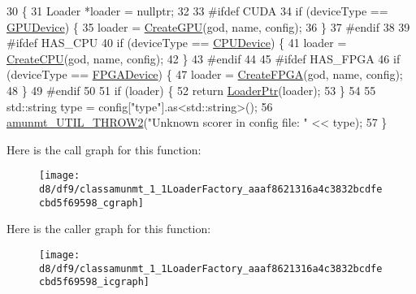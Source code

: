 \begin{DoxyCode}
30                                  \{
31   Loader *loader = \textcolor{keyword}{nullptr};
32 
33 \textcolor{preprocessor}{#ifdef CUDA}
34   \textcolor{keywordflow}{if} (deviceType == \hyperlink{namespaceamunmt_a0f0dad0deb73c5a4c574d8c63833ab17a2ff3f7952956ae21ddcfa3564fe4de5f}{GPUDevice}) \{
35     loader = \hyperlink{classamunmt_1_1LoaderFactory_a78af7437386e23443b9d02bb4f8be24b}{CreateGPU}(god, name, config);
36   \}
37 \textcolor{preprocessor}{#endif}
38 
39 \textcolor{preprocessor}{#ifdef HAS\_CPU}
40   \textcolor{keywordflow}{if} (deviceType == \hyperlink{namespaceamunmt_a0f0dad0deb73c5a4c574d8c63833ab17aafe1036ae66e30a8f082bda43072162a}{CPUDevice}) \{
41     loader = \hyperlink{classamunmt_1_1LoaderFactory_a78832d75891d43a96d36c1e61c6940b4}{CreateCPU}(god, name, config);
42   \}
43 \textcolor{preprocessor}{#endif}
44 
45 \textcolor{preprocessor}{#ifdef HAS\_FPGA}
46   \textcolor{keywordflow}{if} (deviceType == \hyperlink{namespaceamunmt_a0f0dad0deb73c5a4c574d8c63833ab17a1fd21d75952419f8b1ab988f28f747fc}{FPGADevice}) \{
47     loader = \hyperlink{classamunmt_1_1LoaderFactory_a167b89f68880a90da333d3a61458472b}{CreateFPGA}(god, name, config);
48   \}
49 \textcolor{preprocessor}{#endif}
50 
51   \textcolor{keywordflow}{if} (loader) \{
52     \textcolor{keywordflow}{return} \hyperlink{namespaceamunmt_a7907c3626488deed31e31452d178d78e}{LoaderPtr}(loader);
53   \}
54 
55   std::string type = config[\textcolor{stringliteral}{"type"}].as<std::string>();
56   \hyperlink{exception_8h_a620a250f8b1bb0d664281ec2eb1b5b41}{amunmt\_UTIL\_THROW2}(\textcolor{stringliteral}{"Unknown scorer in config file: "} << type);
57 \}
\end{DoxyCode}


Here is the call graph for this function\+:
\nopagebreak
\begin{figure}[H]
\begin{center}
\leavevmode
\texttt{[image: d8/df9/classamunmt\_1\_1LoaderFactory\_aaaf8621316a4c3832bcdfecbd5f69598\_cgraph]}
\end{center}
\end{figure}




Here is the caller graph for this function\+:
\nopagebreak
\begin{figure}[H]
\begin{center}
\leavevmode
\texttt{[image: d8/df9/classamunmt\_1\_1LoaderFactory\_aaaf8621316a4c3832bcdfecbd5f69598\_icgraph]}
\end{center}
\end{figure}


